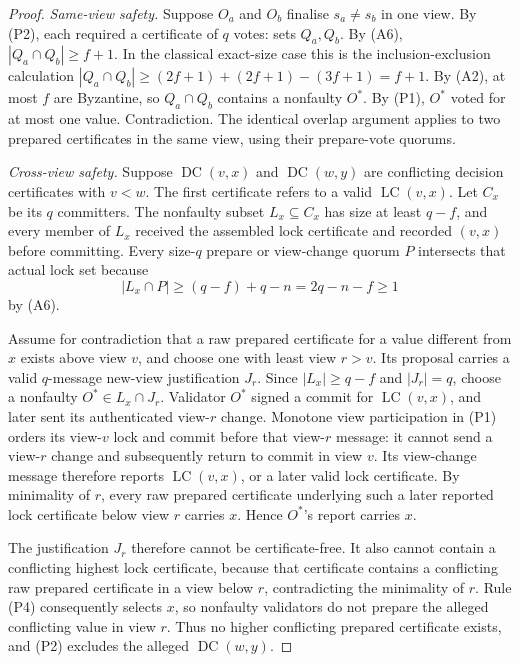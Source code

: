 \begin{proof}
\textit{Same-view safety.}
Suppose $O_a$ and $O_b$ finalise $s_a\neq s_b$ in one view.
By (P2), each required a certificate of $q$ votes: sets $Q_a,Q_b$.
By (A6), $|Q_a\cap Q_b|\geq f+1$.  In the classical exact-size case this is
the inclusion-exclusion calculation
$|Q_a\cap Q_b|\geq(2f+1)+(2f+1)-(3f+1)=f+1$.
By (A2), at most $f$ are Byzantine, so $Q_a\cap Q_b$ contains a
nonfaulty $O^*$.
By (P1), $O^*$ voted for at most one value. Contradiction.
The identical overlap argument applies to two prepared certificates in the
same view, using their prepare-vote quorums.

\textit{Cross-view safety.}
Suppose \(\operatorname{DC}(v,x)\) and
\(\operatorname{DC}(w,y)\) are conflicting decision certificates with
\(v<w\). The first certificate refers to a valid
\(\operatorname{LC}(v,x)\). Let \(C_x\) be its \(q\) committers. The
nonfaulty subset \(L_x\subseteq C_x\) has size at least \(q-f\), and every
member of \(L_x\) received the assembled lock certificate and recorded
\((v,x)\) before committing. Every size-\(q\) prepare or view-change quorum \(P\)
intersects that actual lock set because
\[
 |L_x\cap P|
 \ge (q-f)+q-n
 =2q-n-f
 \ge1
\]
by (A6).

Assume for contradiction that a raw prepared certificate for a value
different from \(x\) exists above view \(v\), and choose one with least view
\(r>v\). Its proposal carries a valid \(q\)-message new-view justification
\(J_r\). Since \(|L_x|\ge q-f\) and \(|J_r|=q\), choose a nonfaulty
\(O^*\in L_x\cap J_r\). Validator \(O^*\) signed a commit for
\(\operatorname{LC}(v,x)\), and later sent its authenticated view-\(r\)
change. Monotone view participation in (P1) orders its view-\(v\) lock and
commit before that view-\(r\) message: it cannot send a view-\(r\) change and
subsequently return to commit in view \(v\). Its view-change message therefore
reports \(\operatorname{LC}(v,x)\), or a later valid lock certificate. By
minimality of \(r\), every raw prepared certificate underlying such a later
reported lock certificate below view \(r\) carries \(x\). Hence \(O^*\)'s
report carries \(x\).

The justification \(J_r\) therefore cannot be certificate-free. It also
cannot contain a conflicting highest lock certificate, because that
certificate contains a conflicting raw prepared certificate in a view below
\(r\), contradicting the minimality of \(r\). Rule (P4) consequently selects
\(x\), so nonfaulty validators do not prepare the alleged conflicting value
in view \(r\).
Thus no higher conflicting prepared certificate exists, and (P2) excludes
the alleged \(\operatorname{DC}(w,y)\).


\end{proof}
